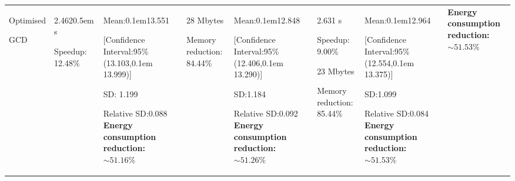{\begin{longtable}{|p{1.15cm}|p{1.3cm}|p{1.8cm}|p{1.5cm}|p{1.8cm}|p{1.8cm}|p{1.8cm}|p{2.5cm}|}
  \cline{1-7}
  Optimised\par GCD & 
  2.462\kern0.5em s\par \vspace{.5em} Speedup: 12.48\% &
  Mean:\kern0.1em13.551\par \vspace{.5em} [Confidence Interval:95\% (13.103,\kern0.1em 13.999)]\par \vspace{.5em} SD: 1.199\par \vspace{.5em} Relative SD:0.088\vspace{.5em} \textbf{Energy consumption reduction: $\sim 51.16\%$}\vspace{.5em}  &
  28 Mbytes\par \vspace{1em} Memory reduction: 84.44\% &
  Mean:\kern0.1em12.848\par \vspace{.5em} [Confidence Interval:95\% (12.406,\kern0.1em 13.290)]\par \vspace{.5em} SD:1.184\par \vspace{.5em} Relative SD:0.092\vspace{.5em} \textbf{Energy consumption reduction: $\sim 51.26\%$}\vspace{.5em} &
  2.631 s\par Speedup: 9.00\%\par \vspace{.5em}
  23 Mbytes\par Memory reduction: 85.44\% &
  Mean:\kern0.1em12.964\par \vspace{.5em} [Confidence Interval:95\% (12.554,\kern0.1em 13.375)]\par \vspace{.5em} SD:1.099\par \vspace{.5em} Relative SD:0.084\vspace{.5em} \textbf{Energy consumption reduction: $\sim 51.53\%$}\vspace{.5em} & \textbf{Energy consumption reduction: $\sim 51.53\%$}\\
  

\end{longtable}}
